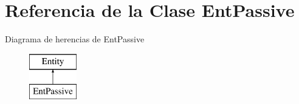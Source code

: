 \hypertarget{classEntPassive}{\section{Referencia de la Clase Ent\-Passive}
\label{classEntPassive}
}
Diagrama de herencias de Ent\-Passive\begin{figure}[H]
\begin{center}
\leavevmode
\includegraphics[height=2.000000cm]{classEntPassive}
\end{center}
\end{figure}
